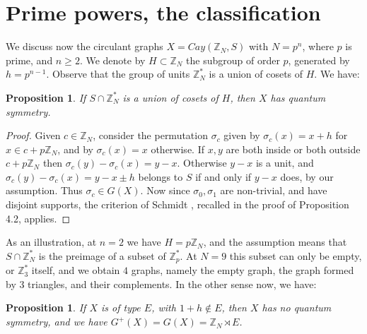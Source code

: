 \documentclass[11pt]{amsart}
\newtheorem{proposition}[theorem]{Proposition}
\newcommand{\Z}{\mathbb Z}
\begin{document}
\section{Prime powers, the classification}

We discuss now the circulant graphs $X=Cay(\Z_N,S)$ with $N=p^n$, where $p$ is prime, and $n\geq2$. We denote by $H\subset\Z_N$ the subgroup of order $p$, generated by $h=p^{n-1}$. Observe that the group of units $\Z_N^*$ is a union of cosets of $H$. We have:

\begin{proposition}
If $S\cap\Z_N^*$ is a union of cosets of $H$, then $X$ has quantum symmetry.
\end{proposition}

\begin{proof}
Given $c\in\Z_N$, consider the permutation $\sigma_c$ given by $\sigma_c(x)=x+h$ for $x\in c+p\Z_N$, and by $\sigma_c(x)=x$ otherwise. If $x,y$ are both inside or both outside $c+p\Z_N$ then $\sigma_c(y)-\sigma_c(x)=y-x$. Otherwise $y-x$ is a unit, and $\sigma_c(y)-\sigma_c(x)=y-x\pm h$ belongs to $S$ if and only if $y-x$ does, by our assumption. Thus $\sigma_c\in G(X)$. Now since $\sigma_0,\sigma_1$ are non-trivial, and have disjoint supports, the criterion of Schmidt \cite{sch}, recalled in the proof of Proposition 4.2, applies.
\end{proof}

As an illustration, at $n=2$ we have $H=p\Z_N$, and the assumption means that $S\cap\Z_N^*$ is the preimage of a subset of $\Z_p^*$. At $N=9$ this subset can only be empty, or $\Z_3^*$ itself, and we obtain $4$ graphs, namely the empty graph, the graph formed by $3$ triangles, and their complements. In the other sense now, we have:

\begin{proposition}
If $X$ is of type $E$, with $1+h\notin E$, then $X$ has no quantum symmetry, and we have $G^+(X)=G(X)=\Z_N\rtimes E$.
\end{proposition}
\end{document}
